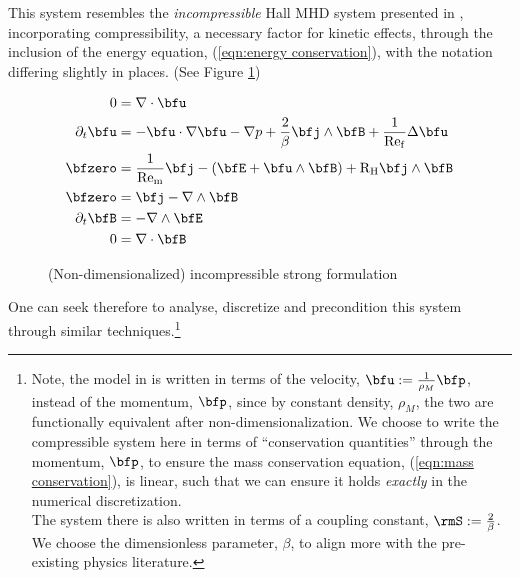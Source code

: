     This system resembles the \emph{incompressible} Hall MHD system presented in \cite{LHF22}, incorporating compressibility, a necessary factor for kinetic effects, through the inclusion of the energy equation, (\ref{eqn:energy conservation}), with the notation differing slightly in places. (See Figure \ref{fig:incompressible strong form})

    \begin{figure}
        \centering
        \line
        \begin{align}
            0  &=  \nabla\cdot\bfu  \label{eqn:incompressible mass conservation}  \\
            \partial_{t}\bfu  &=  - \bfu\cdot\nabla\bfu - \nabla p + \frac{2}{\beta}\bfj\wedge\bfB + \frac{1}{\rmRef}\Delta\bfu  \label{eqn:incompressible momentum conservation}  \\
            \bfzero  &=  \frac{1}{\rmRem}\bfj - \left(\bfE + \bfu\wedge\bfB\right) + \rmRH\bfj\wedge\bfB  \label{eqn:incompressible current identity}  \\
            \bfzero  &=  \bfj - \nabla\wedge\bfB  \label{eqn:incompressible Ampère's law}  \\
            \partial_{t}\bfB  &=  - \nabla\wedge\bfE  \label{eqn:incompressible Faraday's law}  \\
            0  &=  \nabla\cdot\bfB  \label{eqn:incompressible Gauss's law}
        \end{align}
        \line
        \caption{(Non-dimensionalized) incompressible strong formulation}
        \label{fig:incompressible strong form}
    \end{figure}

    One can seek therefore to analyse, discretize and precondition this system through similar techniques.\footnote{Note, the model in \cite{LHF22} is written in terms of the velocity, $\bfu  :=  \frac{1}{\rho_{M}}\bfp$, instead of the momentum, $\bfp$, since by constant density, $\rho_{M}$, the two are functionally equivalent after non-dimensionalization. We choose to write the compressible system here in terms of ``conservation quantities'' through the momentum, $\bfp$, to ensure the mass conservation equation, (\ref{eqn:mass conservation}), is linear, such that we can ensure it holds \emph{exactly} in the numerical discretization. \\ The system there is also written in terms of a coupling constant, $\rmS  :=  \frac{2}{\beta}$. We choose the dimensionless parameter, $\beta$, to align more with the pre-existing physics literature. \BA{([Ref])}}
    
